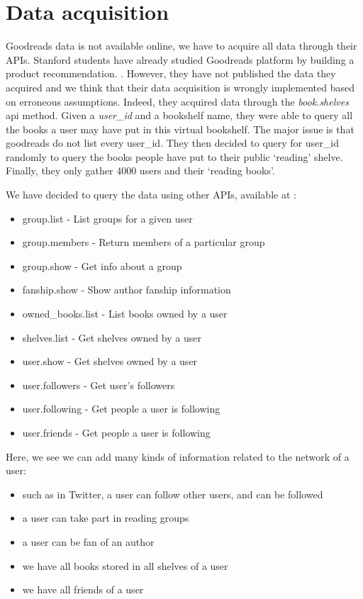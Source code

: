 \documentclass[12pt]{article}
\begin{document}
\section{Data acquisition}

Goodreads data is not available online, we have to acquire all data through their APIs. Stanford students have already studied Goodreads platform by building a product recommendation. \cite{stanford:goodreads}. However, they have not published the data they acquired and we think that their data acquisition is wrongly implemented based on erroneous assumptions. Indeed, they acquired data through the \textit{book.shelves} api method. Given a \textit{user\_id} and a bookshelf name, they were able to query all the books a user may have put in this virtual bookshelf. The major issue is that goodreads do not list every user\_id. They then decided to query for user\_id randomly to query the books people have put to their public `reading' shelve. Finally, they only gather 4000 users and their `reading books'.

We have decided to query the data using other APIs, available at \cite{goodreads:api}:
\begin{itemize}
\item group.list - List groups for a given user
\item group.members - Return members of a particular group
\item group.show - Get info about a group
\item fanship.show - Show author fanship information
\item owned\_books.list - List books owned by a user
\item shelves.list - Get shelves owned by a user
\item user.show - Get shelves owned by a user
\item user.followers - Get user's followers
\item user.following - Get people a user is following
\item user.friends - Get people a user is following
\end{itemize}

Here, we see we can add many kinds of information related to the network of a user:
\begin{itemize}
\item such as in Twitter, a user can follow other users, and can be followed
\item a user can take part in reading groups
\item a user can be fan of an author
\item we have all books stored in all shelves of a user
\item we have all friends of a user
\end{itemize}
\end{document}
